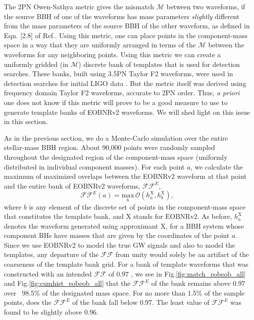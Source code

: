\documentclass[aps,
prd,
amsmath,
amssymb,
twocolumn,
floatfix,
groupedaddress]{revtex4-1}
\newcommand{\Olap}{\mathcal{O}}
\newcommand{\FF}{\mathcal{FF}}
\newcommand{\X}{\mathrm{X}}
\begin{document}
The 2PN Owen-Sathya metric \citep{SathyaMetric2PN} gives the mismatch $\mathcal{M}$ between two waveforms, if the source BBH of one of the waveforms has mass parameters \textit{slightly} different from the mass parameters of the source BBH of the other waveform, as defined in Eqn. [2.8] of Ref.\citep{SathyaMetric2PN}. Using this metric, one can place points in the component-mass space in a way that they are uniformly arranged in terms of the $\mathcal{M}$ between the waveforms for any neighboring points. Using this metric we can create a uniformly gridded (in $\mathcal{M}$) discrete bank of templates that is used for detection searches. These banks, built using 3.5PN Taylor F2 waveforms, were used in detection searches for initial LIGO data \citep{LSCSearch2004,LSCSearch2005,LSCSearch2008}. But the metric itself was derived using frequency domain Taylor F2 waveforms, accurate to 2PN order. Thus, \textit{a priori} one does not know if this metric will prove to be a good measure to use to generate template banks of EOBNRv2 waveforms. We will shed light on this issue in this section.

As in the previous section, we do a Monte-Carlo simulation over the entire stellar-mass BBH region. About 90,000 points were randomly sampled throughout the designated region of the component-mass space (uniformly distributed in individual component masses). For each point $a$, we calculate the maximum of maximized overlaps between the EOBNRv2 waveform at that point and the entire bank of EOBNRv2 waveforms, $\mathcal{FF}^E$,
\begin{equation}
\mathcal{FF}^E(a) = \underset{b}{\mathrm{max}}\,\Olap(h^{\X}_a,h^{\X}_b),
\end{equation}
where $b$ is any element of the discrete set of points in the component-mass space that constitutes the template bank, and $\X$ stands for $\textrm{EOBNRv2}$. As before, $h^{\X}_a$ denotes the waveform generated using approximant $\X$, for a BBH system whose component BHs have masses that are given by the coordinates of the point $a$. Since we use EOBNRv2 to model the true GW signals and also to model the templates, any departure of the $\FF$ from unity would solely be an artifact of the coarseness of the template bank grid. For a bank of template waveforms that was constructed with an intended $\FF$ of $0.97$ \citep{BabaketalBankPlacement,SathyaBankPlacementTauN}, we see in Fig.\ref{fig:match_eobeob_all} and Fig.\ref{fig:cumhist_eobeob_all} that the $\mathcal{FF}^E$ of the bank remains above $0.97$ over ~98.5\% of the designated mass space. For no more than 1.5\% of the sample points, does the $\mathcal{FF}^E$ of the bank fall below 0.97. The least value of $\mathcal{FF}^E$ was found to be slightly above 0.96. 
\end{document}
